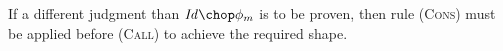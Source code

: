 \documentclass[a4paper,numberwithinsect]{lipics-v2021}
\begin{document}


If a different judgment than $\mathit{Id}\chop\phi_m$ is to be proven,
then rule (\textsc{Cons}) must be applied before (\textsc{Call}) to
achieve the required shape.

\def\defaultHypSeparation{\hskip 2em}
\end{document}
